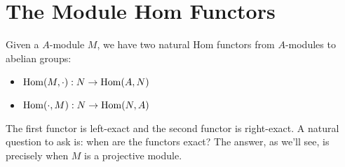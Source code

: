 \section{The Module Hom Functors}
Given a $A$-module $M$, we have two natural Hom functors from $A$-modules to abelian groups:
\begin{itemize}
    \item $\operatorname{Hom}(M, \cdot): N \rightarrow \operatorname{Hom}(A, N)$
    \item $\operatorname{Hom}(\cdot, M): N \rightarrow \operatorname{Hom}(N, A)$
\end{itemize}
The first functor is left-exact and the second functor is right-exact. A natural question to ask is: when are the functors exact? The answer, as we'll see, is precisely when $M$ is a projective module.
